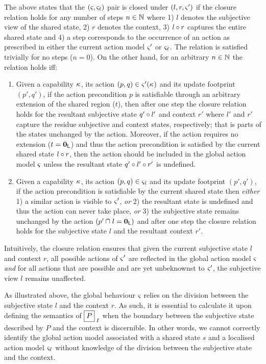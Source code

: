 The above states that the $(\varsigma_{}, \varsigma_{\ell})$ pair is closed under $(l, r, \varsigma_{}')$ if the closure relation holds for any number of steps $n \in \mathbb{N}$ where 1) $l$ denotes the subjective view of the shared state, 2) $r$ denotes the context, 3) $l \circ r$ captures the entire shared state  and 4) a step corresponds to the occurrence of an action as prescribed in either the current action model $\varsigma_{}'$ or $\varsigma_{\ell}$. The relation is satisfied trivially for no steps ($n = 0$). On the other hand, for an arbitrary $n\in \mathbb{N}$ the relation holds iff:
\begin{enumerate}
	\item Given a capability $\kappa_{}$, its action $(p, q) \in \varsigma_{}'(\kappa_{})$ and its update footprint $(p', q')$, if the action precondition $p$ is satisfiable through an arbitrary extension of the shared region ($t$), then after one step the closure relation holds for the resultant subjective state $q' \circ l'$ and context $r'$ where $l'$ and $r'$ capture the residue subjective and context states, respectively; that is parts of the states unchanged by the action. Moreover, if the action requires no extension ($t = \mathbf{0}_{\textsf{L}}$) and thus the action precondition is satisfied by the current shared state $l \circ r$, then the action should be included in the global action model $\varsigma_{}$ unless the resultant state $q' \circ l' \circ r'$ is undefined.
	
	\item Given a capability $\kappa_{}$, its action $(p, q) \in \varsigma_{\ell}$ and its update footprint $(p', q')$, if the action precondition is satisfiable by the current shared state then \emph{either} 1) a similar action is visible to $\varsigma_{}'$, \emph{or} 2) the resultant state is undefined and thus the action can never take place, \emph{or} 3) the subjective state remains unchanged by the action $(p' \mathbin{\bar{\sqcap}}_{} l = \mathbf{0}_{\textsf{L}} )$ and after one step the closure relation holds for the subjective state $l$ and the resultant context $r'$.
\end{enumerate}
Intuitively, the closure relation ensures that given the current subjective state $l$ and context $r$, all possible actions of $\varsigma_{}'$ are reflected in the global action model $\varsigma_{}$ \emph{and} for all actions that are possible and are yet unbeknownst to $\varsigma_{}'$, the subjective view $l$ remains unaffected.

As illustrated above, the global behaviour $\varsigma_{}$ relies on the division between the subjective state $l$ and the context $r$. As such, it is essential to calculate it upon defining the semantics of $\shared{P}{I}$ when the boundary between the subjective state described by $P$ and the context is discernible.  In other words, we cannot correctly identify the global action model associated with  a shared state $s$ and a localised action model $\varsigma_{\ell}$ without knowledge of the division between the subjective state and the context. 







